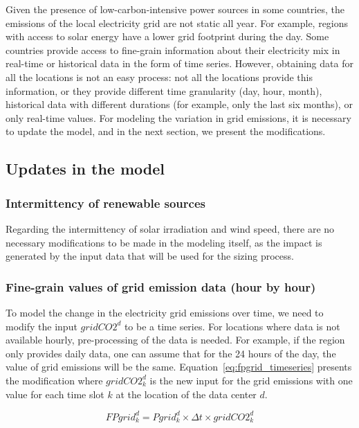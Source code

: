 Given the presence of low-carbon-intensive power sources in some countries, the emissions of the local electricity grid are not static all year. For example, regions with access to solar energy have a lower grid footprint during the day. Some countries provide access to fine-grain information about their electricity mix in real-time or historical data in the form of time series. However, obtaining data for all the locations is not an easy process: not all the locations provide this information, or they provide different time granularity (day, hour, month), historical data with different durations (for example, only the last six months), or only real-time values. For modeling the variation in grid emissions, it is necessary to update the model, and in the next section, we present the modifications.

\subsection{Updates in the model}

\subsubsection{Intermittency of renewable sources}

Regarding the intermittency of solar irradiation and wind speed, there are no necessary modifications to be made in the modeling itself, as the impact is generated by the input data that will be used for the sizing process.
\subsubsection{Fine-grain values of grid emission data (hour by hour)}

To model the change in the electricity grid emissions over time, we need to modify the input $gridCO2^d$ to be a time series. For locations where data is not available hourly, pre-processing of the data is needed. For example, if the region only provides daily data, one can assume that for the 24 hours of the day, the value of grid emissions will be the same. Equation~\eqref{eq:fpgrid_timeseries} presents the modification where $gridCO2^d_k$ is the new input for the grid emissions with one value for each time slot $k$ at the location of the data center $d$.

\begin{equation} \label{eq:fpgrid_timeseries}
FPgrid_k^d = Pgrid_k^d\times \Delta t \times gridCO2^d_k
\end{equation}

